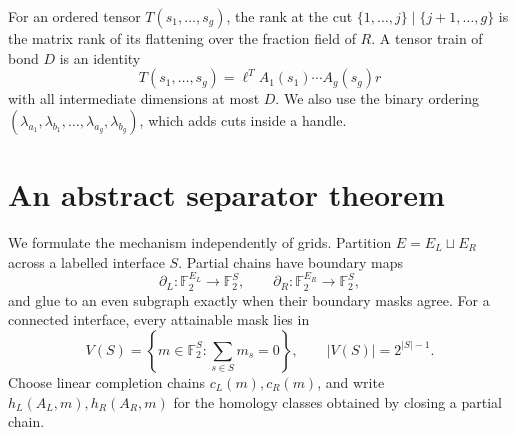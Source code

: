 \documentclass[11pt]{article}
\newcommand{\Ftwo}{\mathbb F_2}
\begin{document}
For an ordered tensor \(T(s_1,\ldots,s_g)\), the rank at the cut
\(\{1,\ldots,j\}\mid\{j+1,\ldots,g\}\) is the matrix rank of its flattening over
the fraction field of \(R\).  A tensor train of bond \(D\) is an identity
\begin{equation}\label{eq:tt}
 T(s_1,\ldots,s_g)=\ell^TA_1(s_1)\cdots A_g(s_g)r
\end{equation}
with all intermediate dimensions at most \(D\).  We also use the binary
ordering
\((\lambda_{a_1},\lambda_{b_1},\ldots,\lambda_{a_g},\lambda_{b_g})\), which
adds cuts inside a handle.

\section{An abstract separator theorem}

We formulate the mechanism independently of grids.  Partition
\(E=E_L\sqcup E_R\) across a labelled interface \(S\).  Partial chains have
boundary maps
\[
 \partial_L:\Ftwo^{E_L}\to\Ftwo^S,
 \qquad
 \partial_R:\Ftwo^{E_R}\to\Ftwo^S,
\]
and glue to an even subgraph exactly when their boundary masks agree.  For a
connected interface, every attainable mask lies in
\begin{equation}\label{eq:VS}
 V(S)=\left\{m\in\Ftwo^S:\sum_{s\in S}m_s=0\right\},
 \qquad |V(S)|=2^{|S|-1}.
\end{equation}
Choose linear completion chains \(c_L(m),c_R(m)\), and write
\(h_L(A_L,m),h_R(A_R,m)\) for the homology classes obtained by closing a
partial chain.
\end{document}
